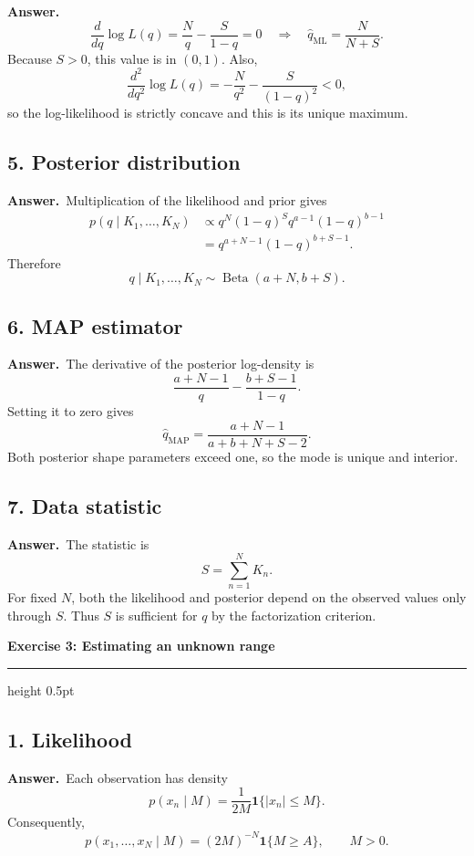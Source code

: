 \documentclass[11pt,a4paper]{article}
\newcommand{\exercise}[2]{%
  \Needspace{8\baselineskip}%
  \par\addvspace{1.1em}%
  {\Large\bfseries\color{examblue}Exercise #1: #2\par}%
  \nobreak\vspace{0.2em}%
  {\color{rulegray}\hrule height 0.5pt}%
  \vspace{0.55em}%
}
\newcommand{\answer}{\textbf{Answer.}\ }
\begin{document}
\answer
\[
  \frac{d}{dq}\log L(q)=\frac{N}{q}-\frac{S}{1-q}=0
  \quad\Longrightarrow\quad
  \boxed{\widehat q_{\mathrm{ML}}=\frac{N}{N+S}}.
\]
Because $S>0$, this value is in $(0,1)$. Also,
\[
  \frac{d^2}{dq^2}\log L(q)
  =-\frac{N}{q^2}-\frac{S}{(1-q)^2}<0,
\]
so the log-likelihood is strictly concave and this is its unique maximum.

\subsection*{5. Posterior distribution}

\answer Multiplication of the likelihood and prior gives
\begin{align*}
  p(q\mid K_1,\ldots,K_N)
  &\propto q^N(1-q)^S q^{a-1}(1-q)^{b-1}\\
  &=q^{a+N-1}(1-q)^{b+S-1}.
\end{align*}
Therefore
\[
  \boxed{q\mid K_1,\ldots,K_N
  \sim\operatorname{Beta}(a+N,b+S)}.
\]

\subsection*{6. MAP estimator}

\answer The derivative of the posterior log-density is
\[
  \frac{a+N-1}{q}-\frac{b+S-1}{1-q}.
\]
Setting it to zero gives
\[
  \boxed{\widehat q_{\mathrm{MAP}}
  =\frac{a+N-1}{a+b+N+S-2}}.
\]
Both posterior shape parameters exceed one, so the mode is unique and interior.

\subsection*{7. Data statistic}

\answer The statistic is
\[
  \boxed{S=\sum_{n=1}^{N}K_n}.
\]
For fixed $N$, both the likelihood and posterior depend on the observed values only through $S$. Thus $S$ is sufficient for $q$ by the factorization criterion.

\exercise{3}{Estimating an unknown range}

\subsection*{1. Likelihood}

\answer Each observation has density
\[
  p(x_n\mid M)=\frac{1}{2M}\mathbf{1}\{|x_n|\leq M\}.
\]
Consequently,
\[
  \boxed{p(x_1,\ldots,x_N\mid M)
  =(2M)^{-N}\mathbf{1}\{M\geq A\}},
  \qquad M>0.
\]
\end{document}
